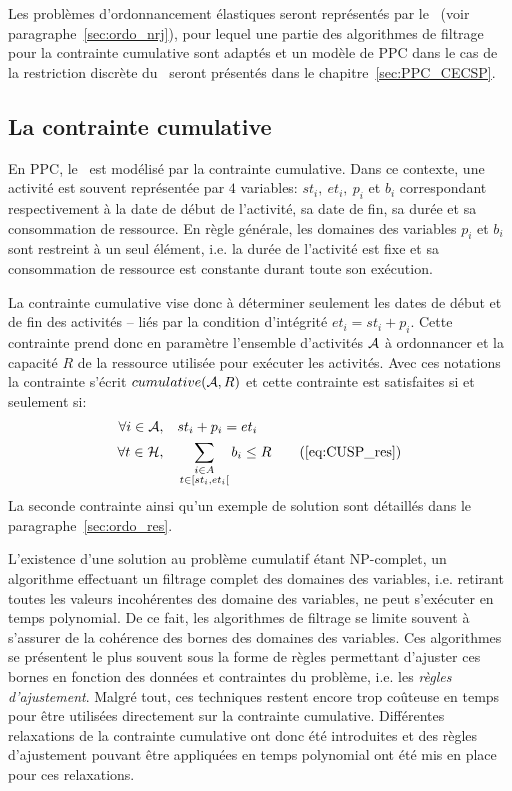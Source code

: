 Les problèmes d'ordonnancement élastiques seront représentés par le
\CECSP~(voir paragraphe~\ref{sec:ordo_nrj}), pour lequel une partie
des algorithmes de filtrage pour la contrainte cumulative sont adaptés
et un modèle de PPC dans le cas de la restriction discrète du
\CECSP~seront présentés dans le chapitre~\ref{sec:PPC_CECSP}.

\subsection{La contrainte cumulative}
\label{sec:cumu_cume}

En PPC, le \CUSP~est modélisé par la contrainte cumulative. Dans ce
contexte, une activité est souvent représentée par $4$ variables:
$st_i,\ et_i,\ p_i$ et $b_i$ correspondant respectivement à la date de
début de l'activité, sa date de fin, sa durée et sa consommation de
ressource. En règle générale, les domaines des variables $p_i$ et
$b_i$ sont restreint à un seul élément, i.e. la durée de l'activité
est fixe et sa consommation de ressource est constante durant toute
son exécution. 

La contrainte cumulative vise donc à déterminer seulement les dates de
début et de fin des activités -- liés par la condition d'intégrité
$et_i=st_i+p_i$. Cette contrainte prend donc en paramètre l'ensemble
d'activités ${\cal A}$ à ordonnancer et la capacité $R$ de la ressource utilisée
pour exécuter les activités. Avec ces notations la contrainte s'écrit
$cumulative({\cal A},R)$ et cette contrainte est satisfaites si et seulement 
si:
\begin{align}
  \forall i \in \A, & \quad  st_i+p_i=et_i \label{eq:CUSP_int}\\
  \forall t \in \H, &\quad \sum_{\substack{i \in A\\t \in
  [st_i,et_i[}} b_i \le R  \tag{\ref{eq:CUSP_res}} 
\end{align}
La seconde contrainte ainsi qu'un exemple de solution sont détaillés
dans le paragraphe~\ref{sec:ordo_res}.

L'existence d'une solution au problème cumulatif étant NP-complet, un
algorithme effectuant un filtrage complet des domaines des variables,
i.e. retirant toutes les valeurs incohérentes des domaine des
variables, ne peut s'exécuter en temps polynomial. De ce fait, les
algorithmes de filtrage se limite souvent à s'assurer de la cohérence
des bornes des domaines des variables. Ces algorithmes se présentent
le plus souvent sous la forme de règles permettant d'ajuster ces
bornes en fonction des données et contraintes du problème,
i.e. les {\it règles d'ajustement}. Malgré tout, ces techniques
restent encore trop coûteuse en temps pour être utilisées directement
sur la contrainte cumulative.  Différentes relaxations de la
contrainte cumulative ont donc été introduites et des règles
d'ajustement pouvant être appliquées en temps polynomial ont été mis
en place pour ces relaxations.

